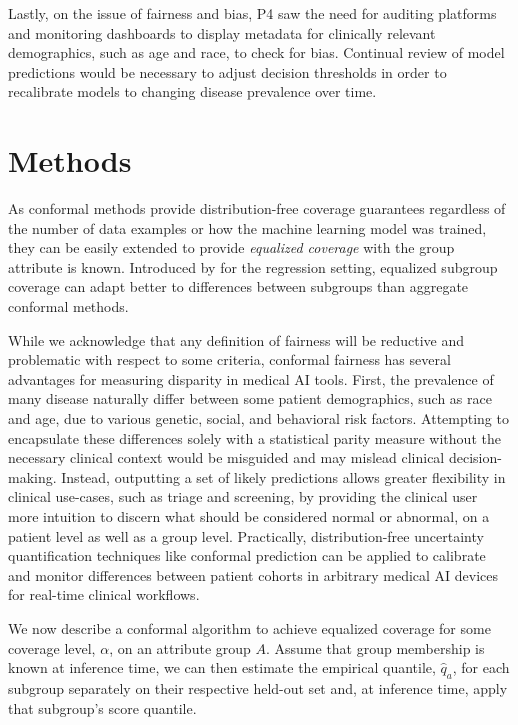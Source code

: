 \documentclass[letterpaper]{article} %
\begin{document}
    Lastly, on the issue of fairness and bias, P4 saw the need for auditing platforms and monitoring dashboards to display metadata for clinically relevant demographics, such as age and race, to check for bias.
    Continual review of model predictions would be necessary to adjust decision thresholds in order to recalibrate models to changing disease prevalence over time.

\section{Methods}
    As conformal methods provide distribution-free coverage guarantees regardless of the number of data examples or how the machine learning model was trained, they can be easily extended to provide \textit{equalized coverage} with the group attribute is known.
    Introduced by \citet{Romano2020With} for the regression setting, equalized subgroup coverage can adapt better to differences between subgroups than aggregate conformal methods.

    While we acknowledge that any definition of fairness will be reductive and problematic with respect to some criteria, conformal fairness has several advantages for measuring disparity in medical AI tools.
    First, the prevalence of many disease naturally differ between some patient demographics, such as race and age, due to various genetic, social, and behavioral risk factors.
    Attempting to encapsulate these differences solely with a statistical parity measure without the necessary clinical context would be misguided and may mislead clinical decision-making.
    Instead, outputting a set of likely predictions allows greater flexibility in clinical use-cases, such as triage and screening, by providing the clinical user more intuition to discern what should be considered normal or abnormal, on a patient level as well as a group level.
    Practically, distribution-free uncertainty quantification techniques like conformal prediction can be applied to calibrate and monitor differences between patient cohorts in arbitrary medical AI devices for real-time clinical workflows.

    We now describe a conformal algorithm to achieve equalized coverage for some coverage level, $\alpha$, on an attribute group $A$.
    Assume that group membership is known at inference time, we can then estimate the empirical quantile, $\hat{q}_a$, for each subgroup separately on their respective held-out set and, at inference time, apply that subgroup's score quantile.
\end{document}
